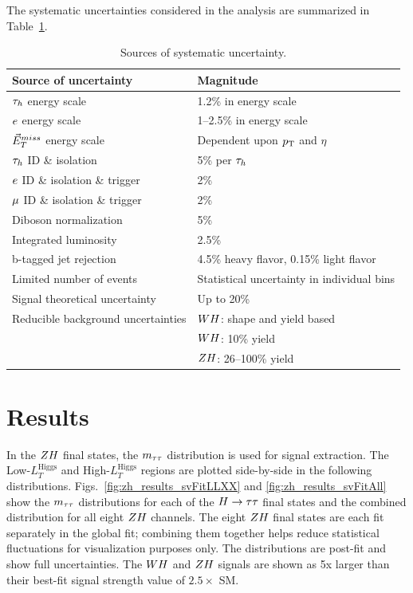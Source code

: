 The systematic uncertainties considered in the analysis are summarized in Table~\ref{tab:uncertainties}.

\begin{table}[!ht]
\centering
{}
\begin{tabular}{ll}
Source of uncertainty & Magnitude \\
\hline
 $\tau_{h}$ energy scale                & 1.2\% in energy scale\\
 $e$ energy scale               & 1--2.5\%  in energy scale \\
 $\vec{E}^{miss}_T$ energy scale              & Dependent upon $p_\mathrm{T}$ and $\eta$ \\
 $\tau_{h}$ ID \& isolation & 5\% per $\tau_{h}$  \\
 $e$ ID \& isolation \& trigger  &   2\%  \\
 $\mu$ ID \& isolation \& trigger & 2\%  \\
 Diboson normalization & 5\% \\
 Integrated luminosity     & 2.5\%  \\
 b-tagged jet rejection & 4.5\% heavy flavor, 0.15\% light flavor \\
 Limited number of events                & Statistical uncertainty in individual bins  \\
 Signal theoretical uncertainty  & Up to 20\% \\
 Reducible background uncertainties & $WH$: shape and yield based \\
                                    & $WH$: 10\% yield \\
                                    & $ZH$: 26--100\% yield \\
\hline
\end{tabular}
\caption{Sources of systematic uncertainty.}
\label{tab:uncertainties}
\end{table}



\section{Results}
\label{sec:results}


In the $ZH$ final states, the $m_{\tau\tau}$ distribution is
used for signal extraction. The Low-$L_{T}^{\textrm{Higgs}}$ and
High-$L_{T}^{\textrm{Higgs}}$ regions are plotted side-by-side
in the following distributions. Figs.~\ref{fig:zh_results_svFitLLXX} 
and \ref{fig:zh_results_svFitAll} show the
$m_{\tau\tau}$ distributions for each of the $H\to\tau\tau$ final states and
the combined distribution for all eight $ZH$ channels.
The eight $ZH$ final states are each fit separately in the global
fit; combining them together helps reduce statistical
fluctuations for visualization purposes only.
The distributions are post-fit and show full uncertainties.
The $WH$ and $ZH$ signals are shown as 5x larger than their best-fit
signal strength value of $2.5 \times$ SM.


